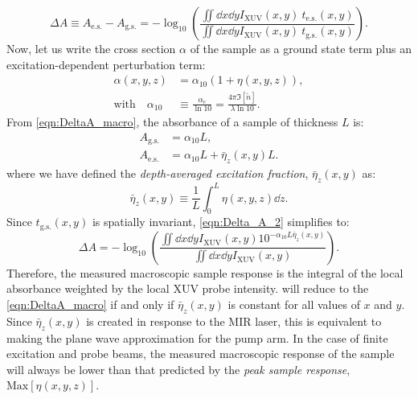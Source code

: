 \begin{equation}
\Delta A \equiv A_{\textrm{e.s.}} - A_{\textrm{g.s.}} = - \log_{10} \left( \frac{\iint \dd{x} \dd{y} I_{\textrm{XUV}}(x,y) \ t_{\textrm{e.s.}}(x,y)}{\iint \dd{x} \dd{y} I_{\textrm{XUV}}(x,y) \ t_{\textrm{g.s.}}(x,y)} \right).
\label{eqn:Delta_A_2}
\end{equation}
Now, let us write the cross section $\alpha$ of the sample as a ground state term plus an excitation-dependent perturbation term:
\begin{equation}
\begin{aligned}
\label{eqn:deltaA_perturbation}
\alpha(x,y,z) &= \alpha_{10} (1 + \eta(x,y,z)), \\
\textrm{with} \quad \alpha_{10} &\equiv \frac{\alpha_e}{\ln 10} = \frac{4 \pi \Im [\tilde{n}]}{\lambda \ln 10}.
\end{aligned}
\end{equation}
From \cref{eqn:DeltaA_macro}, the absorbance of a sample of thickness $L$ is:
\begin{equation}
\begin{aligned}
A_{\textrm{g.s.}} &= \alpha_{10} L, \\
A_{\textrm{e.s.}} &= \alpha_{10} L + \bar{\eta}_z(x,y) L.
\end{aligned}
\end{equation}
where we have defined the \textit{depth-averaged excitation fraction}, $\bar{\eta}_z(x,y)$ as:
\begin{equation}
\bar{\eta}_z(x,y) \equiv \frac{1}{L} \int_{0}^{L} \eta(x,y,z) \dd{z}.
\label{eqn:eta_z}
\end{equation}
Since $t_{\textrm{g.s.}}(x,y)$ is spatially invariant, \cref{eqn:Delta_A_2} simplifies to:
\begin{equation}
\Delta A = -\log_{10} \left( \frac{ \iint \dd{x} \dd{y} I_{\textrm{XUV}}(x,y) 10^{- \alpha_{10} L \bar{\eta}_z(x,y)}}{ \iint \dd{x} \dd{y} I_{\textrm{XUV}}(x,y)} \right).
\label{eqn:Delta_A_3}
\end{equation}
Therefore, the measured macroscopic sample response is the integral of the local absorbance weighted by the local XUV probe intensity.  will reduce to the \cref{eqn:DeltaA_macro} if and only if $\bar{\eta}_z(x,y)$ is constant for all values of $x$ and $y$. Since $\bar{\eta}_z(x,y)$ is created in response to the MIR laser, this is equivalent to making the plane wave approximation for the pump arm. In the case of finite excitation and probe beams, the measured macroscopic response of the sample will always be lower than that predicted by the \textit{peak sample response}, $\textrm{Max}[\eta(x,y,z)]$. 

